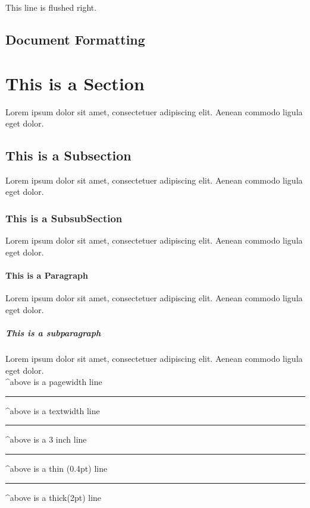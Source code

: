 \documentclass[12pt]{article}
\begin{document}
\begin{flushright}
    This line is flushed right. 
\end{flushright}


\subsection{Document Formatting}

\section*{This is a Section}
Lorem ipsum dolor sit amet, consectetuer adipiscing elit. Aenean commodo ligula eget dolor. \\[5pt]

\subsection*{This is a Subsection}
Lorem ipsum dolor sit amet, consectetuer adipiscing elit. Aenean commodo ligula eget dolor. \\[5pt]

\subsubsection*{This is a SubsubSection}
Lorem ipsum dolor sit amet, consectetuer adipiscing elit. Aenean commodo ligula eget dolor. \\[5pt]

\paragraph*{This is a Paragraph}
Lorem ipsum dolor sit amet, consectetuer adipiscing elit. Aenean commodo ligula eget dolor. \\[5pt]

\subparagraph*{This is a subparagraph}
Lorem ipsum dolor sit amet, consectetuer adipiscing elit. Aenean commodo ligula eget dolor. \\[5pt]

\makebox[\linewidth]{\rule{\paperwidth}{1pt}}
\textasciicircum above is a pagewidth line \\[5pt]
\rule{\textwidth}{1pt}
\textasciicircum above is a textwidth line \\[5pt]
\begin{center}
    \rule{3in}{1pt}
\end{center}
\textasciicircum above is a 3 inch line \\[5pt]
\rule{\textwidth}{0.4pt}
\textasciicircum above is a thin (0.4pt) line \\[5pt]
\rule{\textwidth}{2pt}
\textasciicircum above is a thick(2pt) line \\[5pt]
\end{document}
